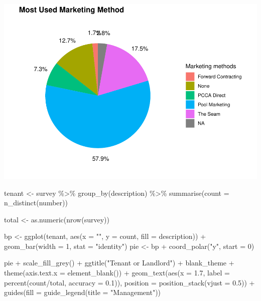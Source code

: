 \documentclass[
]{article}
\newenvironment{Shaded}{\begin{snugshade}}{\end{snugshade}}
\newcommand{\AttributeTok}[1]{\textcolor[rgb]{0.77,0.63,0.00}{#1}}
\newcommand{\DecValTok}[1]{\textcolor[rgb]{0.00,0.00,0.81}{#1}}
\newcommand{\FloatTok}[1]{\textcolor[rgb]{0.00,0.00,0.81}{#1}}
\newcommand{\FunctionTok}[1]{\textcolor[rgb]{0.00,0.00,0.00}{#1}}
\newcommand{\NormalTok}[1]{#1}
\newcommand{\OtherTok}[1]{\textcolor[rgb]{0.56,0.35,0.01}{#1}}
\newcommand{\SpecialCharTok}[1]{\textcolor[rgb]{0.00,0.00,0.00}{#1}}
\newcommand{\StringTok}[1]{\textcolor[rgb]{0.31,0.60,0.02}{#1}}
\begin{document}
\includegraphics{pcca_survey_files/figure-latex/most-used-all-1.pdf}

\begin{Shaded}
\begin{Highlighting}[]
\NormalTok{tenant }\OtherTok{\textless{}{-}}\NormalTok{ survey }\SpecialCharTok{\%\textgreater{}\%}
    \FunctionTok{group\_by}\NormalTok{(description) }\SpecialCharTok{\%\textgreater{}\%}
    \FunctionTok{summarise}\NormalTok{(}\AttributeTok{count =} \FunctionTok{n\_distinct}\NormalTok{(number))}

\NormalTok{total }\OtherTok{\textless{}{-}} \FunctionTok{as.numeric}\NormalTok{(}\FunctionTok{nrow}\NormalTok{(survey))}

\NormalTok{bp }\OtherTok{\textless{}{-}} \FunctionTok{ggplot}\NormalTok{(tenant, }\FunctionTok{aes}\NormalTok{(}\AttributeTok{x =} \StringTok{""}\NormalTok{, }\AttributeTok{y =}\NormalTok{ count, }\AttributeTok{fill =}\NormalTok{ description)) }\SpecialCharTok{+}
    \FunctionTok{geom\_bar}\NormalTok{(}\AttributeTok{width =} \DecValTok{1}\NormalTok{, }\AttributeTok{stat =} \StringTok{"identity"}\NormalTok{)}
\NormalTok{pie }\OtherTok{\textless{}{-}}\NormalTok{ bp }\SpecialCharTok{+} \FunctionTok{coord\_polar}\NormalTok{(}\StringTok{"y"}\NormalTok{, }\AttributeTok{start =} \DecValTok{0}\NormalTok{)}

\NormalTok{pie }\SpecialCharTok{+} \FunctionTok{scale\_fill\_grey}\NormalTok{() }\SpecialCharTok{+} \FunctionTok{ggtitle}\NormalTok{(}\StringTok{"Tenant or Landlord"}\NormalTok{) }\SpecialCharTok{+}\NormalTok{ blank\_theme }\SpecialCharTok{+}
    \FunctionTok{theme}\NormalTok{(}\AttributeTok{axis.text.x =} \FunctionTok{element\_blank}\NormalTok{()) }\SpecialCharTok{+} \FunctionTok{geom\_text}\NormalTok{(}\FunctionTok{aes}\NormalTok{(}\AttributeTok{x =} \FloatTok{1.7}\NormalTok{,}
    \AttributeTok{label =} \FunctionTok{percent}\NormalTok{(count}\SpecialCharTok{/}\NormalTok{total, }\AttributeTok{accuracy =} \FloatTok{0.1}\NormalTok{)), }\AttributeTok{position =} \FunctionTok{position\_stack}\NormalTok{(}\AttributeTok{vjust =} \FloatTok{0.5}\NormalTok{)) }\SpecialCharTok{+}
    \FunctionTok{guides}\NormalTok{(}\AttributeTok{fill =} \FunctionTok{guide\_legend}\NormalTok{(}\AttributeTok{title =} \StringTok{"Management"}\NormalTok{))}
\end{Highlighting}
\end{Shaded}
\end{document}
